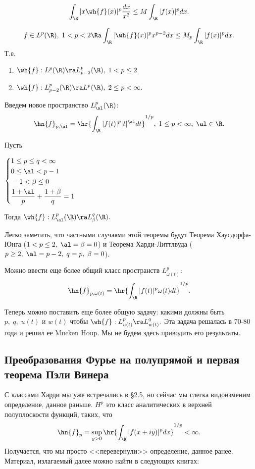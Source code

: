 \documentclass{article}
\begin{document}
$$\int_{\R }|x\wh{f}(x)|^p\frac{dx}{x^2}\le M\int_{\R }|f(x)|^p
dx.$$

\begin{theorem}
$$f\in L^p(\R ),\;1<p<2\Ra
\int_{\R }|\wh{f}(x)|^px^{p-2}dx\le M_p\int_{\R }|f(x)|^pdx.$$ Т.е.
\begin{enumerate}
\item
$\wh{f}:L^p(\R )\ra L^p_{p-2}(\R ),\;1<p\le2$
\item
$\wh{f}:L^p_{p-2}(\R )\ra L^p(\R ),\;2\le p<\infty.$
\end{enumerate}
\end{theorem}

Введем новое пространство $L^p_{\al}(\R )$:
$$\hn{f}_{p,\al}=\hr{\int_{\R }|f(t)|^p|t|^{\al}dt}^{1/p},\;1\le p<\infty,\;\al\in \R .$$
\begin{theorem}[Питт]
Пусть

\begin{center}$\left\{\begin{aligned}
&1\le p\le q<\infty\\
&0\le\al<p-1\\
&-1<\beta\le0\\
&\frac{1+\al}p+\frac{1+\beta}q=1
\end{aligned}\right.$
\end{center}
Тогда $\wh{f}:L^p_{\al}(\R )\ra L^q_{\beta}(\R ).$
\end{theorem}

\begin{wrapfigure}[10]{l}{220pt}
\end{wrapfigure}

Легко заметить, что частными случаями этой теоремы будут Теорема Хаусдорфа-Юнга ($1<p\le2,\;\al=\beta=0$)
и Теорема Харди-Литтлвуда ($p\ge2,\;\al=p-2,\;q=p,\;\beta=0$).

Можно ввести еще более общий класс пространств $L^p_{\omega(t)}$:
$$\hn{f}_{p,\omega(t)}=\hr{\int_{\R }|f(t)|^p\omega(t)dt}^{1/p}.$$

Теперь можно поставить еще более общую задачу: какими должны быть $p,\;q,\;u(t)$ и $w(t)$ чтобы
$\wh{f}:L^p_{u(t)}\ra L^q_{w(t)}.$ Эта задача решалась в 70-80 года и решил ее Mucken Houp. Мы
не будем здесь приводить его результаты.

\subsection{Преобразования Фурье на полупрямой и первая теорема Пэли Винера}
С классами Харди мы уже встречались в \S2.5, но сейчас мы слегка видоизменим определение, данное раньше.
$H^p$ это класс аналитических в верхней полуплоскости функций, таких, что
$$\hn{f}_p=\sup_{y>0}\hr{\int_{\R }|f(x+iy)|^pdx}^{1/p}<\infty. $$
Получается, что мы просто <<перевернули>> определение, данное ранее. Материал, излагаемый далее можно найти в
следующих книгах:
\end{document}
